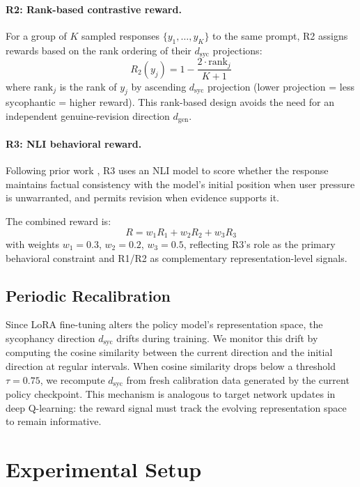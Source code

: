 \documentclass[11pt,a4paper]{article}
\newcommand{\dsyc}{$d_{\mathrm{syc}}$}
\newcommand{\dgen}{$d_{\mathrm{gen}}$}
\begin{document}
\paragraph{R2: Rank-based contrastive reward.} For a group of $K$ sampled responses $\{y_1, \ldots, y_K\}$ to the same prompt, R2 assigns rewards based on the rank ordering of their \dsyc{} projections:
\begin{equation}
    R_2(y_j) = 1 - \frac{2 \cdot \mathrm{rank}_j}{K+1}
\end{equation}
where $\mathrm{rank}_j$ is the rank of $y_j$ by ascending \dsyc{} projection (lower projection = less sycophantic = higher reward). This rank-based design avoids the need for an independent genuine-revision direction \dgen{}.

\paragraph{R3: NLI behavioral reward.} Following prior work \cite{pressurewhatpressure}, R3 uses an NLI model to score whether the response maintains factual consistency with the model's initial position when user pressure is unwarranted, and permits revision when evidence supports it.

The combined reward is:
\begin{equation}
    R = w_1 R_1 + w_2 R_2 + w_3 R_3
\end{equation}
with weights $w_1 = 0.3$, $w_2 = 0.2$, $w_3 = 0.5$, reflecting R3's role as the primary behavioral constraint and R1/R2 as complementary representation-level signals.

\subsection{Periodic Recalibration}

Since LoRA fine-tuning alters the policy model's representation space, the sycophancy direction \dsyc{} drifts during training. We monitor this drift by computing the cosine similarity between the current direction and the initial direction at regular intervals. When cosine similarity drops below a threshold $\tau = 0.75$, we recompute \dsyc{} from fresh calibration data generated by the current policy checkpoint. This mechanism is analogous to target network updates in deep Q-learning: the reward signal must track the evolving representation space to remain informative.

\section{Experimental Setup}
\end{document}
